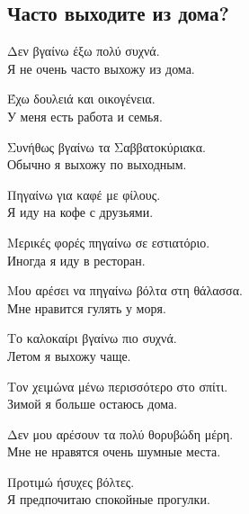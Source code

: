 \documentclass[12pt]{article}
\newcommand{\my}[1]{\textcolor{gray!80!white}{#1}}
\newenvironment{page}{\clearpage\normalsize\null\vfill}{\vfill\null}
\newenvironment{textblock}{\begin{minipage}{\textwidth}}{\end{minipage}\smallskip}
\begin{document}
	\begin{page}
		\subsection{Часто выходите из дома?}
		\small
		\begin{textblock}
			Δεν βγαίνω έξω πολύ συχνά.\\
			\my{Я не очень часто выхожу из дома.}
			
			Έχω δουλειά και οικογένεια.\\
			\my{У меня есть работа и семья.}
			
			Συνήθως βγαίνω τα Σαββατοκύριακα.\\
			\my{Обычно я выхожу по выходным.}
			
			Πηγαίνω για καφέ με φίλους.\\
			\my{Я иду на кофе с друзьями.}
			
			Μερικές φορές πηγαίνω σε εστιατόριο.\\
			\my{Иногда я иду в ресторан.}
			
			Μου αρέσει να πηγαίνω βόλτα στη θάλασσα.\\
			\my{Мне нравится гулять у моря.}
			
			Το καλοκαίρι βγαίνω πιο συχνά.\\
			\my{Летом я выхожу чаще.}
			
			Τον χειμώνα μένω περισσότερο στο σπίτι.\\
			\my{Зимой я больше остаюсь дома.}
			
			Δεν μου αρέσουν τα πολύ θορυβώδη μέρη.\\
			\my{Мне не нравятся очень шумные места.}
			
			Προτιμώ ήσυχες βόλτες.\\
			\my{Я предпочитаю спокойные прогулки.}
		\end{textblock}
	\end{page}
	
\end{document}
